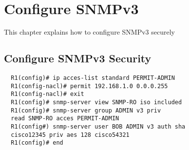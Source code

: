\section{Configure SNMPv3}
This chapter explains how to configure SNMPv3 securely
\subsection{Configure SNMPv3 Security}
\begin{verbatim}
  R1(config)# ip acces-list standard PERMIT-ADMIN
  R1(config-nacl)# permit 192.168.1.0 0.0.0.255
  R1(config-nacl)# exit
  R1(config)# snmp-server view SNMP-RO iso included
  R1(config)# snmp-server group ADMIN v3 priv
  read SNMP-RO acces PERMIT-ADMIN
  R1(config#) snmp-server user BOB ADMIN v3 auth sha
  cisco12345 priv aes 128 cisco54321
  R1(config)# end
\end{verbatim}
